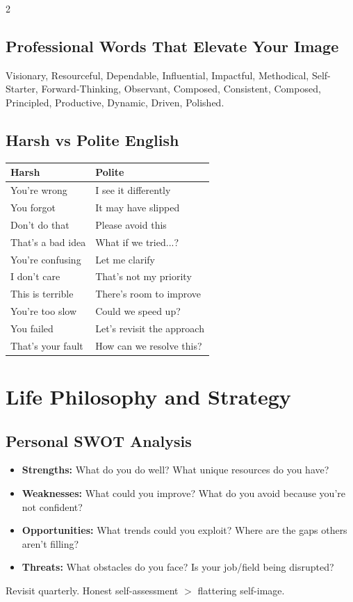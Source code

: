 \documentclass[10pt,a4paper]{article}
\begin{document}
\begin{multicols}{2}
\subsection{Professional Words That Elevate Your Image}
Visionary, Resourceful, Dependable, Influential, Impactful, Methodical, Self-Starter, Forward-Thinking, Observant, Composed, Consistent, Composed, Principled, Productive, Dynamic, Driven, Polished.

\subsection{Harsh vs Polite English}
\begin{tabular}{@{}ll@{}}
\toprule
\textbf{Harsh} & \textbf{Polite} \\
\midrule
You're wrong & I see it differently \\
You forgot & It may have slipped \\
Don't do that & Please avoid this \\
That's a bad idea & What if we tried...? \\
You're confusing & Let me clarify \\
I don't care & That's not my priority \\
This is terrible & There's room to improve \\
You're too slow & Could we speed up? \\
You failed & Let's revisit the approach \\
That's your fault & How can we resolve this? \\
\bottomrule
\end{tabular}

\section{Life Philosophy and Strategy}

\subsection{Personal SWOT Analysis}
\begin{itemize}
\item \textbf{Strengths:} What do you do well? What unique resources do you have?
\item \textbf{Weaknesses:} What could you improve? What do you avoid because you're not confident?
\item \textbf{Opportunities:} What trends could you exploit? Where are the gaps others aren't filling?
\item \textbf{Threats:} What obstacles do you face? Is your job/field being disrupted?
\end{itemize}
Revisit quarterly. Honest self-assessment $>$ flattering self-image.


\end{multicols}
\end{document}
